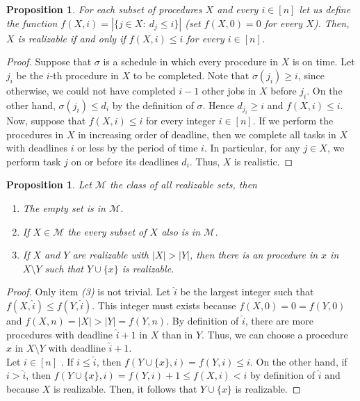 \documentclass[12pt]{amsart}
\newtheorem{propo}[lemma]{Proposition}
\numberwithin{equation}{section}
\begin{document}
\begin{propo}
For each subset of procedures $X$ and every $i\in [n]$ let us define the function $f(X,i)=|\{j\in X: \ d_j\leq i  \}|$ (set $f(X,0)=0$ for every $X$). Then, $X$ is realizable if and only if $f(X,i)\leq i$ for every $i\in [n]$. 
\end{propo} 
\begin{proof}
Suppose that $\sigma$ is a schedule in which every procedure in $X$ is on time. Let $j_i$ be the $i$-th procedure in $X$ to be completed. Note that $\sigma(j_i)\geq i$, since otherwise, we could not have completed $i-1$ other jobs in $X$ before $j_i$. On the other hand, $\sigma(j_i)\leq d_i$ by the definition of $\sigma$. Hence $d_{j_i}\geq i$ and $f(X,i)\leq i$. \\
Now, suppose that $f(X,i)\leq i$ for every integer $i\in [n]$. If we perform the procedures in $X$ in increasing order of deadline, then we complete all tasks in $X$ with deadlines $i$ or less by the period of time $i$. In particular, for any $j\in X$, we perform task $j$ on or before its deadlines $d_i$. Thus, $X$ is realistic.         
\end{proof}
\begin{propo}
Let $\mathcal{M}$ the class of all realizable sets, then
\begin{enumerate}
\item The empty set is in $\mathcal{M}$.
\item If $X\in \mathcal{M}$ the every subset of $X$ also is in $\mathcal{M}$.
\item If $X$ and $Y$ are realizable with $|X|>|Y|$, then there is an procedure in $x$ in $X\setminus Y$ such that $Y\cup\{x\}$ is realizable.
\end{enumerate}
\end{propo}
\begin{proof}
Only item \textit{(3)} is not trivial. Let $\hat{i}$ be the largest integer such that $f(X,\hat{i})\leq f(Y,\hat{i})$. This integer must exists because $f(X,0)=0=f(Y,0)$ and $f(X,n)=|X|>|Y|=f(Y,n)$. By definition of $\hat{i}$, there are more procedures with deadline $\hat{i}+1$ in $X$ than in $Y$.  Thus, we can choose a procedure $x$ in $X\setminus Y$ with deadline $\hat{i}+1$. \\
Let $i\in [n]$ . If $i\leq \hat{i}$, then $f(Y\cup\{x\},i)=f(Y,i)\leq i$. On the other hand, if $i>\hat{i}$, then $f(Y\cup\{x\},i)=f(Y,i)+1\leq f(X,i)<i$ by definition of $\hat{i}$ and because $X$ is realizable. Then, it follows that $Y\cup\{x\}$ is realizable.       
\end{proof}
\end{document}
